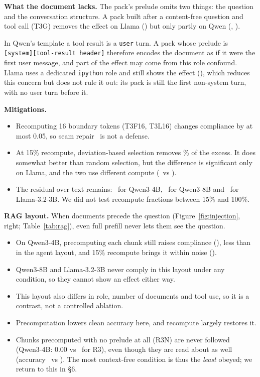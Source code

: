 \documentclass[10pt]{article}
\newcommand{\cond}[1]{\textsf{#1}}
\begin{document}
\textbf{What the document lacks.} The pack's prelude omits two things: the question and the conversation structure. A pack built after
a content-free question and tool call (\cond{T3G}) removes the effect on Llama (\InjDGLlama) but only partly on Qwen (\InjDGFour,
\InjDGEight).

In Qwen's template a tool result is a \texttt{user} turn. A pack whose prelude is \texttt{[system][tool-result header]} therefore
encodes the document as if it were the first user message, and part of the effect may come from this role confound. Llama uses a
dedicated \texttt{ipython} role and still shows the effect (\InjDLlama), which reduces this concern but does not rule it out: its pack is
still the first non-system turn, with no user turn before it.

\textbf{Mitigations.}
\begin{itemize}\itemsep0pt
\item Recomputing 16 boundary tokens (\cond{T3F16}, \cond{T3L16}) changes compliance by at most 0.05, so seam
  repair~\citep{li2026notes} is not a defense.
\item At 15\% recompute, deviation-based selection removes \MitigShareRange\% of the excess. It does somewhat better than random
  selection, but the difference is significant only on Llama, and the two use different compute (\FracBlend\ vs \FracRandom).
\item The residual over text remains: \InjResidFour\ for Qwen3-4B, \InjResidEight\ for Qwen3-8B and \InjResidLlama\ for Llama-3.2-3B.
  We did not test recompute fractions between 15\% and 100\%.
\end{itemize}

\begin{table}[t]
\centering\small

\caption{RAG layout: three retrieved documents, with the injected one at position 0, 1 or 2 (\InjNtrials\ injected trials per cell).}
\label{tab:rag}
\end{table}
\textbf{RAG layout.} When documents precede the question (Figure~\ref{fig:injection}, right; Table~\ref{tab:rag}), even full prefill
never lets them see the question.
\begin{itemize}\itemsep0pt
\item On Qwen3-4B, precomputing each chunk still raises compliance (\RagDFour), less than in the agent layout, and 15\% recompute brings
  it within noise (\RagDBFour).
\item Qwen3-8B and Llama-3.2-3B never comply in this layout under any condition, so they cannot show an effect either way.
\item This layout also differs in role, number of documents and tool use, so it is a contrast, not a controlled ablation.
\item Precomputation lowers clean accuracy here, and recompute largely restores it.
\item Chunks precomputed with no prelude at all (\cond{R3N}) are never followed (Qwen3-4B: 0.00 vs \RagRthreeFour\ for \cond{R3}), even
  though they are read about as well (accuracy \RagRthreeNAccFour\ vs \RagRthreeAccFour). The most context-free condition is thus the
  \emph{least} obeyed; we return to this in \S6.
\end{itemize}
\end{document}
